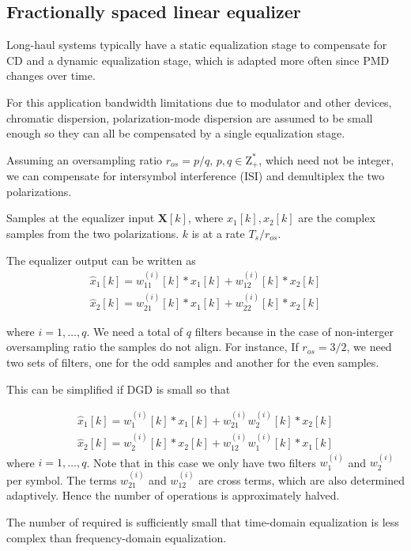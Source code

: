 \documentclass[a4paper]{article}
\begin{document}
\subsection{Fractionally spaced linear equalizer}

Long-haul systems typically have a static equalization stage to compensate for CD and a dynamic equalization stage, which is adapted more often since PMD changes over time.

For this application bandwidth limitations due to modulator and other devices, chromatic dispersion, polarization-mode dispersion are assumed to be small enough so they can all be compensated by a single equalization stage. 

Assuming an oversampling ratio $r_{os} = p/q$, $p, q \in \mathrm{Z^*_+}$, which need not be integer, we can compensate for intersymbol interference (ISI) and demultiplex the two polarizations.

Samples at the equalizer input $\bm{X}[k]$, where $x_1[k], x_2[k]$ are the complex samples from the two polarizations. $k$ is at a rate $T_s/r_{os}$.

The equalizer output can be written as
\begin{align}
\hat{x}_{1}[k] = w^{(i)}_{11}[k]\ast x_1[k] + w^{(i)}_{12}[k]\ast x_2[k] \\
\hat{x}_{2}[k] = w^{(i)}_{21}[k]\ast x_1[k] + w^{(i)}_{22}[k]\ast x_2[k]
\end{align}

where $i = 1, \ldots, q$. We need a total of $q$ filters because in the case of non-interger oversampling ratio the samples do not align. For instance, If $r_{os} = 3/2$, we need two sets of filters, one for the odd samples and another for the even samples.

This can be simplified if DGD is small so that 

\begin{align}
\hat{x}_{1}[k] = w^{(i)}_{1}[k]\ast x_1[k] + w_{21}^{(i)}w^{(i)}_{2}[k]\ast x_2[k] \\
\hat{x}_{2}[k] = w^{(i)}_{2}[k]\ast x_2[k] + w_{12}^{(i)}w^{(i)}_{1}[k]\ast x_1[k]
\end{align}
where $i = 1, \ldots, q$. Note that in this case we only have two filters $w^{(i)}_{1}$ and $w^{(i)}_{2}$ per symbol. The terms $w_{21}^{(i)}$ and $w_{12}^{(i)}$ are cross terms, which are also determined adaptively. Hence the number of operations is approximately halved.

The number of required is sufficiently small that time-domain equalization is less complex than frequency-domain equalization.
\end{document}
